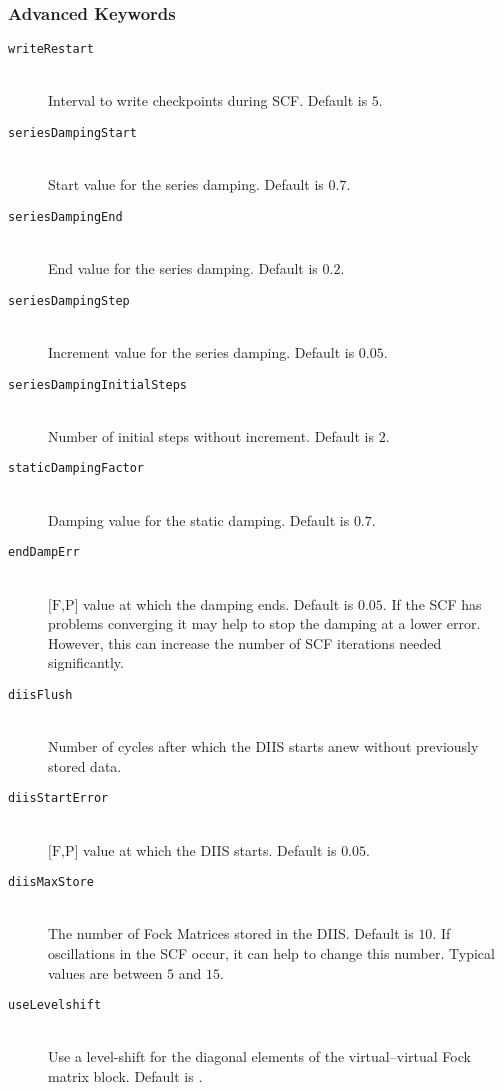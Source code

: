 \subsubsection{Advanced Keywords}
\begin{description}
    \item [\texttt{writeRestart}]\hfill \\
    Interval to write checkpoints during SCF. Default is $5$.
   \item [\texttt{seriesDampingStart}]\hfill \\
    Start value for the series damping. Default is $0.7$.
    \item [\texttt{seriesDampingEnd}]\hfill \\
    End value for the series damping. Default is $0.2$.
    \item [\texttt{seriesDampingStep}]\hfill \\
    Increment value for the series damping. Default is $0.05$.
    \item [\texttt{seriesDampingInitialSteps}]\hfill \\
    Number of initial steps without increment. Default is $2$.
    \item [\texttt{staticDampingFactor}]\hfill \\
    Damping value for the static damping. Default is $0.7$.
    \item [\texttt{endDampErr}]\hfill \\
    $\text{[F,P]}$ value at which the damping ends. Default is $0.05$.
    If the SCF has problems converging it may help to stop the damping at a lower error. However, this can
    increase the number of SCF iterations needed significantly.
    \item [\texttt{diisFlush}]\hfill \\
    Number of cycles after which the DIIS starts anew without previously stored data.
    \item [\texttt{diisStartError}]\hfill \\
    $\text{[F,P]}$ value at which the DIIS starts. Default is $0.05$.
    \item [\texttt{diisMaxStore}]\hfill \\
    The number of Fock Matrices stored in the DIIS. Default is $10$. If oscillations in the SCF occur, it can
    help to change this number. Typical values are between $5$ and $15$.
    \item [\texttt{useLevelshift}]\hfill \\
    Use a level-shift for the diagonal elements of the virtual--virtual Fock matrix block. Default is .

\end{description}
